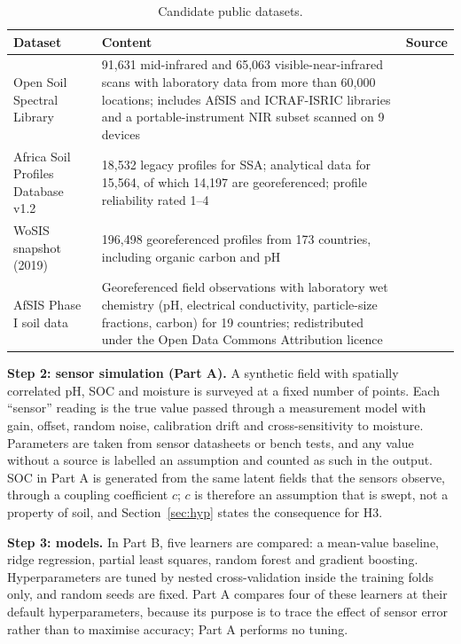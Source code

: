 \documentclass[conference]{IEEEtran}
\begin{document}
\begin{table}[t]
\caption{Candidate public datasets.}
\label{tab:datasets}
\centering
\footnotesize
\begin{tabular}{@{}p{1.5cm}p{3.9cm}p{0.9cm}@{}}
\toprule
Dataset & Content & Source\\
\midrule
Open Soil Spectral Library & 91,631 mid-infrared and 65,063 visible-near-infrared scans with laboratory data from more than 60,000 locations; includes AfSIS and ICRAF-ISRIC libraries and a portable-instrument NIR subset scanned on 9 devices & \cite{ref18}\\
Africa Soil Profiles Database v1.2 & 18,532 legacy profiles for SSA; analytical data for 15,564, of which 14,197 are georeferenced; profile reliability rated 1--4 & \cite{ref19}\\
WoSIS snapshot (2019) & 196,498 georeferenced profiles from 173 countries, including organic carbon and pH & \cite{ref20}\\
AfSIS Phase I soil data & Georeferenced field observations with laboratory wet chemistry (pH, electrical conductivity, particle-size fractions, carbon) for 19 countries; redistributed under the Open Data Commons Attribution licence & \cite{ref21}\\
\bottomrule
\end{tabular}
\end{table}

\noindent\textbf{Step 2: sensor simulation (Part A).} A synthetic field with
spatially correlated pH, SOC and moisture is surveyed at a fixed number of
points. Each ``sensor'' reading is the true value passed through a measurement
model with gain, offset, random noise, calibration drift and cross-sensitivity to
moisture. Parameters are taken from sensor datasheets or bench tests, and any
value without a source is labelled an assumption and counted as such in the
output. SOC in Part A is generated from the same latent fields that the sensors
observe, through a coupling coefficient $c$; $c$ is therefore an assumption that
is swept, not a property of soil, and Section~\ref{sec:hyp} states the
consequence for H3.

\noindent\textbf{Step 3: models.} In Part B, five learners are compared: a
mean-value baseline, ridge regression, partial least squares, random forest and
gradient boosting. Hyperparameters are tuned by nested cross-validation inside
the training folds only, and random seeds are fixed. Part A compares four of
these learners at their default hyperparameters, because its purpose is to trace
the effect of sensor error rather than to maximise accuracy; Part A performs no
tuning.
\end{document}
